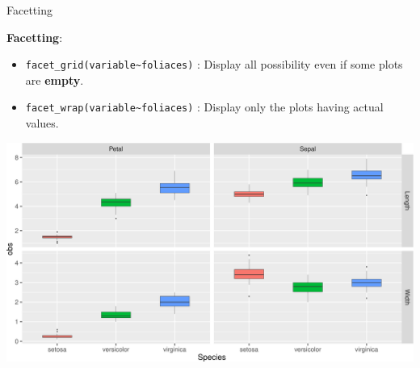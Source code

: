 \documentclass[14pt,ignorenonframetext,]{bredelebeamer}
\providecommand{\tightlist}{%
  \setlength{\itemsep}{0pt}\setlength{\parskip}{0pt}}
\begin{document}
\begin{frame}[fragile]{Facetting}

\textbf{Facetting}:

\begin{itemize}
\tightlist
\item
  \texttt{facet\_grid(variable\textasciitilde{}foliaces)} : Display all
  possibility even if some plots are \textbf{empty}.
\item
  \texttt{facet\_wrap(variable\textasciitilde{}foliaces)} : Display only
  the plots having actual values.
\end{itemize}

\includegraphics{tidyverse_28_03_files/figure-beamer/unnamed-chunk-77-1.pdf}

\end{frame}
\end{document}
